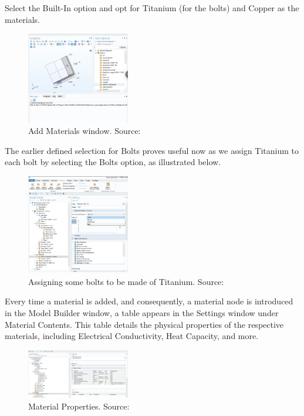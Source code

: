 Select the Built-In option and opt for Titanium (for the bolts) and Copper as the materials.

\begin{figure}[ht!]
  \centering
  \includegraphics[width=0.4\textwidth]{Chapters/Figures/Chapter 3 Figures/Add Material Window.png}
  \caption{Add Materials window. Source: \cite{multiphysics__modeling_nodate}}
  \label{fig:Add Materials window.}
\end{figure}

The earlier defined selection for Bolts proves useful now as we assign Titanium to each bolt by selecting the Bolts option, as illustrated below.

\begin{figure}[ht!]
  \centering
  \includegraphics[width=0.4\textwidth]{Chapters/Figures/Chapter 3 Figures/Bolts Selection Choice.png}
  \caption{Assigning some bolts to be made of Titanium. Source: \cite{multiphysics__modeling_nodate}}
  \label{fig:Assigning some bolts to be made of Titanium.}
\end{figure}

Every time a material is added, and consequently, a material node is introduced in the Model Builder window, a table appears in the Settings window under Material Contents. This table details the physical properties of the respective materials, including Electrical Conductivity, Heat Capacity, and more.

\begin{figure}[ht!]
  \centering
  \includegraphics[width=0.4\textwidth]{Chapters/Figures/Chapter 3 Figures/Material Contents in Settings Window.png}
  \caption{Material Properties. Source: \cite{multiphysics__modeling_nodate}}
  \label{fig: Material properties.}
\end{figure}



